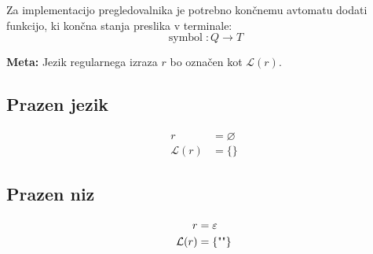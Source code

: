 \documentclass{article}
\DeclareMathOperator{\acc}{symbol}
\newcommand{\Special}[1]{\textbf{#1}}
\newcommand{\Empty}{\varnothing}
\newcommand{\Null}{\varepsilon}
\newcommand{\Language}[1]{\mathcal{L}(#1)}
\newcommand{\Automaton}[1]{\mathcal{M}(#1)}
\newcommand{\Str}[1]{\text{\textquotedbl\texttt{#1}\textquotedbl}}
\begin{document}
Za implementacijo pregledovalnika je potrebno končnemu avtomatu dodati funkcijo, ki končna stanja preslika v terminale:
\begin{equation*}
  \acc: Q \rightarrow T
\end{equation*}

\Special{Meta:} Jezik regularnega izraza $r$ bo označen kot $\Language{r}$.\\

\subsection{Prazen jezik}
\begin{tcolorbox}[title={Definicija}]
\begin{equation*}
  \begin{aligned}
    r &= \Empty\\
    \Language{r} &= \{\}
  \end{aligned}
\end{equation*}
\end{tcolorbox}

\begin{center}
\end{center}


\subsection{Prazen niz}

\begin{tcolorbox}[title={Definicija}]
\begin{equation*}
  \begin{aligned}
    r &= \Null\\
    \Language{r} &= \{ \Str{} \}
  \end{aligned}
\end{equation*}
\end{tcolorbox}

\begin{center}
\end{center}
\end{document}
